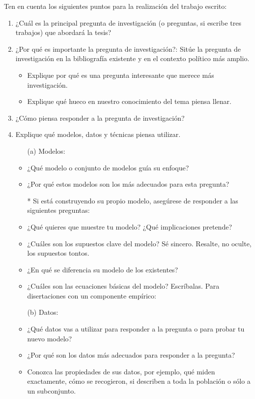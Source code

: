 Ten en cuenta los siguientes puntos para la realización del trabajo escrito:
\begin{enumerate}
\item ¿Cuál es la principal pregunta de investigación (o preguntas, si escribe tres trabajos) que abordará la tesis?

\item ¿Por qué es importante la pregunta de investigación?: Sitúe la pregunta de investigación en la bibliografía existente y en el contexto político más amplio.

  \begin{itemize}
  \item Explique por qué es una pregunta interesante que merece más investigación.
  \item Explique qué hueco en nuestro conocimiento del tema piensa llenar.
  \end{itemize}

\item ¿Cómo piensa responder a la pregunta de investigación?
\item Explique qué modelos, datos y técnicas piensa utilizar.
  \begin{itemize}
  \item[(a)] Modelos:
  \item ¿Qué modelo o conjunto de modelos guía su enfoque?
  \item ¿Por qué estos modelos son los más adecuados para esta pregunta?

  \item[*] Si está construyendo su propio modelo, asegúrese de responder a las siguientes preguntas:
  \item ¿Qué quieres que muestre tu modelo? ¿Qué implicaciones pretende?
  \item ¿Cuáles son los supuestos clave del modelo? Sé sincero. Resalte, no oculte, los supuestos tontos.
  \item ¿En qué se diferencia su modelo de los existentes?
  \item ¿Cuáles son las ecuaciones básicas del modelo? Escríbalas. Para disertaciones con un componente empírico:


    \item[(b)] Datos:

    \item ¿Qué datos vas a utilizar para responder a la pregunta o para probar tu nuevo modelo?
    \item ¿Por qué son los datos más adecuados para responder a la pregunta?
    \item Conozca las propiedades de sus datos, por ejemplo, qué miden exactamente, cómo se recogieron, si describen a toda la población o sólo a un subconjunto.


\end{itemize}
\end{enumerate}
